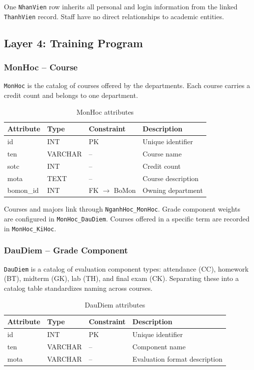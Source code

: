 \documentclass[12pt,a4paper]{report}
\begin{document}
One \texttt{NhanVien} row inherits all personal and login information from the linked \texttt{ThanhVien} record. Staff have no direct relationships to academic entities.

\subsection{Layer 4: Training Program}

\subsubsection{MonHoc -- Course}

\texttt{MonHoc} is the catalog of courses offered by the departments. Each course carries a credit count and belongs to one department.

\begin{table}[H]
\renewcommand{\arraystretch}{1.35}
\caption{MonHoc attributes}
\label{tab:monhoc}
\begin{tabular}{|p{3cm}|p{2.5cm}|p{2.5cm}|p{5.5cm}|}
  \hline
  \textbf{Attribute} & \textbf{Type} & \textbf{Constraint} & \textbf{Description} \\
  \hline
  id & INT & PK & Unique identifier \\
  \hline
  ten & VARCHAR & -- & Course name \\
  \hline
  sotc & INT & -- & Credit count \\
  \hline
  mota & TEXT & -- & Course description \\
  \hline
  bomon\_id & INT & FK $\to$ BoMon & Owning department \\
  \hline
\end{tabular}
\end{table}

Courses and majors link through \texttt{NganhHoc\_MonHoc}. Grade component weights are configured in \texttt{MonHoc\_DauDiem}. Courses offered in a specific term are recorded in \texttt{MonHoc\_KiHoc}.

\subsubsection{DauDiem -- Grade Component}

\texttt{DauDiem} is a catalog of evaluation component types: attendance (CC), homework (BT), midterm (GK), lab (TH), and final exam (CK). Separating these into a catalog table standardizes naming across courses.

\begin{table}[H]
\renewcommand{\arraystretch}{1.35}
\caption{DauDiem attributes}
\label{tab:daudiem}
\begin{tabular}{|p{3cm}|p{2.5cm}|p{2.5cm}|p{5.5cm}|}
  \hline
  \textbf{Attribute} & \textbf{Type} & \textbf{Constraint} & \textbf{Description} \\
  \hline
  id & INT & PK & Unique identifier \\
  \hline
  ten & VARCHAR & -- & Component name \\
  \hline
  mota & VARCHAR & -- & Evaluation format description \\
  \hline
\end{tabular}
\end{table}
\end{document}
